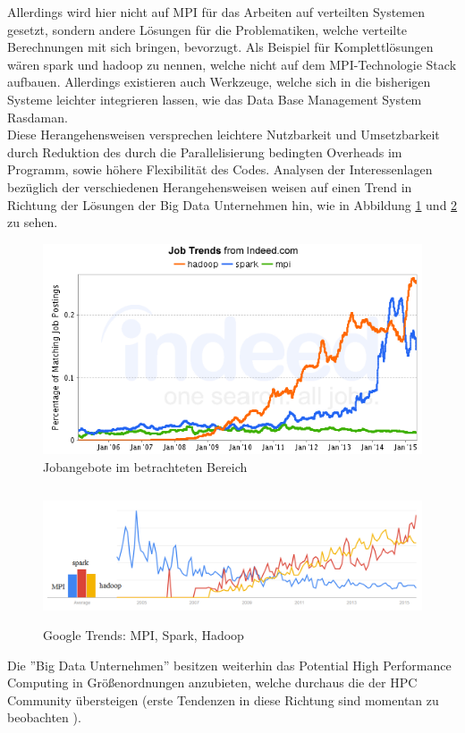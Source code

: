 \documentclass[
	12pt,
	a4paper,
	BCOR10mm,
	DIV14,
	listof=totoc,
	bibliography=totoc,
	headsepline
]{scrreprt}
\begin{document}
Allerdings wird hier nicht auf MPI für das Arbeiten auf verteilten Systemen gesetzt, sondern andere Lösungen für die Problematiken, welche verteilte Berechnungen mit sich bringen, bevorzugt.
Als Beispiel für Komplettlösungen wären spark und hadoop zu nennen, welche nicht auf dem MPI-Technologie Stack aufbauen. 
Allerdings existieren auch Werkzeuge, welche sich in die bisherigen Systeme leichter integrieren lassen, wie das Data Base Management System Rasdaman. \\
Diese Herangehensweisen versprechen leichtere Nutzbarkeit und Umsetzbarkeit durch Reduktion des durch die Parallelisierung bedingten Overheads im Programm, sowie höhere Flexibilität des Codes.
Analysen der Interessenlagen bezüglich der verschiedenen Herangehensweisen weisen auf einen Trend in Richtung der Lösungen der Big Data Unternehmen hin, wie in Abbildung \ref{fig:hpcdies1} und \ref{fig:hpcdies2} zu sehen. 
\begin{figure}[ht]
\centering
\includegraphics[scale=0.8]{./pics/jobgraph.png}
\caption{Jobangebote im betrachteten Bereich}
\label{fig:hpcdies1}
\end{figure}
\begin{figure}[ht]
\centering
\includegraphics[width=1\textwidth, height=150px]{./pics/trends.png}
\caption{Google Trends: MPI, Spark, Hadoop}
\label{fig:hpcdies2}
\end{figure}
Die ''Big Data Unternehmen'' besitzen weiterhin das Potential High Performance Computing in Größenordnungen anzubieten, welche durchaus die der HPC Community übersteigen (erste Tendenzen in diese Richtung sind momentan zu beobachten \cite{HLR}). \\
\end{document}
